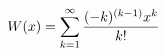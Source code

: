\documentclass[18pt]{amsart}
\theoremstyle{plain} %
\theoremstyle{definition}
\theoremstyle{remark}
\begin{document}
\title{}
\author{Andrew Robbins}
\date{}
\begin{align}\notag W(x) = \sum_{k=1}^{\infty} \frac{(-k)^{(k-1)} x^k}{k!} \end{align}
\end{document}
